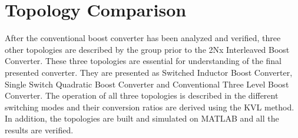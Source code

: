 \section{Topology Comparison}\label{ch:CBC}

After the conventional boost converter has been analyzed and verified,
three other topologies are described by the group prior to the 2Nx Interleaved Boost Converter.
These three topologies are essential for understanding of the final presented converter.
They are presented as Switched Inductor Boost Converter, Single Switch Quadratic Boost Converter and Conventional Three Level Boost Converter.
The operation of all three topologies is described in the different switching modes and their conversion ratios are derived using the KVL method. 
In addition, the topologies are built and simulated on MATLAB and all the results are verified.

